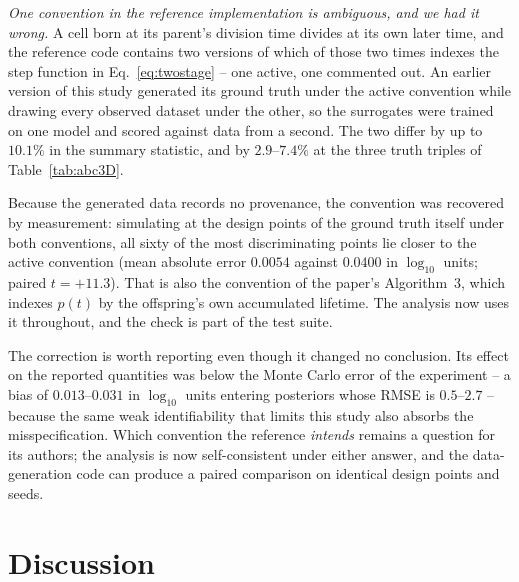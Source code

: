 \documentclass[sn-basic,iicol,pdflatex]{sn-jnl}
\begin{document}
\emph{One convention in the reference implementation is ambiguous, and we had it
wrong.} A cell born at its parent's division time divides at its own later time,
and the reference code contains two versions of which of those two times indexes
the step function in Eq.~\eqref{eq:twostage} -- one active, one commented out.
An earlier version of this study generated its ground truth under the active
convention while drawing every observed dataset under the other, so the
surrogates were trained on one model and scored against data from a second. The
two differ by up to $10.1\%$ in the summary statistic, and by $2.9$--$7.4\%$ at
the three truth triples of Table~\ref{tab:abc3D}.

Because the generated data records no provenance, the convention was recovered
by measurement: simulating at the design points of the ground truth itself under
both conventions, all sixty of the most discriminating points lie closer to the
active convention (mean absolute error $0.0054$ against $0.0400$ in $\log_{10}$
units; paired $t = +11.3$). That is also the convention of the paper's
Algorithm~3, which indexes $p(t)$ by the offspring's own accumulated lifetime.
The analysis now uses it throughout, and the check is part of the test suite.

The correction is worth reporting even though it changed no conclusion. Its
effect on the reported quantities was below the Monte Carlo error of the
experiment -- a bias of $0.013$--$0.031$ in $\log_{10}$ units entering
posteriors whose RMSE is $0.5$--$2.7$ -- because the same weak identifiability
that limits this study also absorbs the misspecification. Which convention the
reference \emph{intends} remains a question for its authors; the analysis is now
self-consistent under either answer, and the data-generation code can produce a
paired comparison on identical design points and seeds.

\section{Discussion}
\label{sec:discussion}
\end{document}
